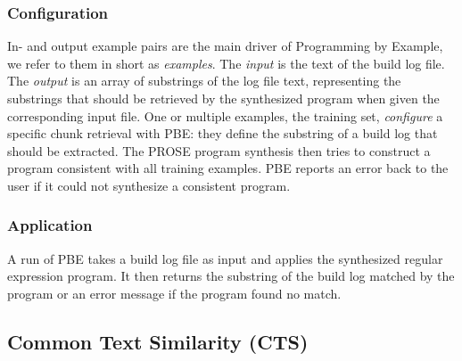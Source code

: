 \subsubsection{Configuration}
In- and output example pairs are the main driver of Programming by
Example, we refer to them in short as \emph{examples}. The
\emph{input} is the text of the build log file. The \emph{output} is
an array of substrings of the log file text, representing the
substrings that should be retrieved by the synthesized program when
given the corresponding input file. One or multiple examples, the
training set, \emph{configure} a specific chunk retrieval with PBE:
they define the substring of a build log that should be extracted. The
PROSE program synthesis then tries to construct a program consistent
with all training examples.
PBE reports an error back to the user if it could not synthesize a
consistent program.


\subsubsection{Application}
A run of PBE takes a build log file as input and applies the
synthesized regular expression program. It then returns the substring
of the build log matched by the program or an error message if the
program found no match.


\subsection{Common Text Similarity (CTS)}
\label{sec:expl-ts}

